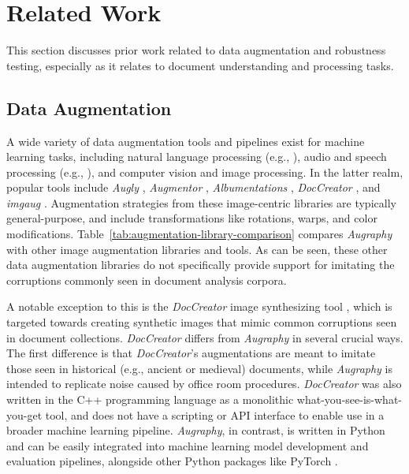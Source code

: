 \documentclass[runningheads]{llncs}
\begin{document}
\section{Related Work}


This section discusses prior work related to data augmentation and robustness testing, especially as it relates to document understanding and processing tasks.

\subsection{Data Augmentation}
A wide variety of data augmentation tools and pipelines exist for machine learning tasks, including  natural language processing (e.g., \cite{feng-etal-2021-survey,fadaee-etal-2017-data,wei-zou-2019-eda}), audio and speech processing (e.g., \cite{ko15_interspeech,audiogmenter,audio-framework}), and computer vision and image processing.
In the latter realm, popular tools include \emph{Augly} \cite{Papakipos2022-gq-augly}, \emph{Augmentor} \cite{augmentor}, \emph{Albumentations} \cite{ref_albumentations}, \emph{DocCreator} \cite{ref_DocCreator}, and \emph{imgaug} \cite{ref_imgaug}.
Augmentation strategies from these image-centric libraries are typically general-purpose, and include transformations like rotations, warps, and color modifications.
Table~\ref{tab:augmentation-library-comparison} compares \emph{Augraphy} with other image augmentation libraries and tools.
As can be seen, these other data augmentation libraries do not specifically provide support for imitating the corruptions commonly seen in document analysis corpora.

A notable exception to this is the \emph{DocCreator} image synthesizing tool \cite{ref_DocCreator}, which is targeted towards creating synthetic images that mimic common corruptions seen in document collections.
\emph{DocCreator} differs from \emph{Augraphy} in several crucial ways.
The first difference is that \emph{DocCreator}'s augmentations are meant to imitate those seen in historical (e.g., ancient or medieval) documents, while \emph{Augraphy} is intended to replicate noise caused by office room procedures.
\emph{DocCreator} was also written in the C++ programming language as a monolithic what-you-see-is-what-you-get tool, and does not have a scripting or API interface to enable use in a broader machine learning pipeline.
\emph{Augraphy}, in contrast, is written in Python and can be easily integrated into machine learning model development and evaluation pipelines, alongside other Python packages like PyTorch \cite{ref_PyTorch}.
\end{document}
